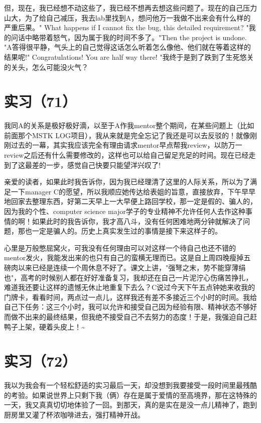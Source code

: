 \documentclass[12pt]{book}
\begin{document}
但，现在，我已经想不动这些了，我已经不想再去想这些问题了。现在的自己压力山大，为了给自己减压，我去lab里找到A，想问他万一我做不出来会有什么样的严重后果。" What happens if I cannot fix the bug, this detailed requirement? "我 的问话中略带着怒气，因为属于我的时间不多了。"Then the project is undone. "A答得很平静，气头上的自己觉得这话怎么听着怎么像他、他们就在等着这样的结果呢!" Congratulations! You are half way there! "我终于是到了跌到了生死悠关的关头，怎么可能没火气？


\section{实习（71）　}
\label{sec-5-74}

我同A的关系是极好极好滴，以至于A作我mentor整个期间，在某些问题上（比如前面那个MSTK LOG项目），我从来就是完全忘记了我还是可以去反驳的！就像刚刚过去的一幕，其实我应该完全有理由请求mentor早点帮我review，以防万一review之后还有什么需要修改的，这样也可以给自己留足充足的时间。现在已经走到了这最差的一步，感觉自己快要只能望洋兴叹了!

亲爱的读者，如果此时我告诉你，因为我已经理清了这里的人际关系，所以为了满足一下manager C的愿望，所以我顺应她传达给表姐的旨意，直接放弃，下午早早地回家去整理东西，好第二天早上一大早便上路回学校，那一定是假的、骗人的，因为我的个性、computer science major学子的专业精神不允许任何人去作这种事情的啊！如果此时的我告诉你，我才高八斗，没有任何困难地两分钟就解决了问题，那也一定是骗人的。历史上真实发生过的事情是接下来这样子的。　

心里是万般憋屈窝火，可我没有任何理由可以对这样一个待自己也还不错的mentor发火，我能发出来的也只有自己的蛮横无理而已。这是自上周四晚瘦掉五磅肉以来已经是连续一个周休息不好了。课文上讲，"强弩之末，势不能穿薄绢也"，高考的时候别人都在好好准备复习，我却还在自己一片泥泞心伤痛苦挣扎，难道我还要让这样的遗憾无休止地重复下去么？C说过今天下午五点钟她来收我的门牌卡，看看时间，两点过一点儿，这样我还有差不多接近三个小时的时间。我给自己下任务：这三个小时，我可以允许和接受自己因为经验有限、精神状态不够好而做不出来的最终结果，但我绝不接受自己不去努力的态度！于是，我强迫自己赶鸭子上架，硬着头皮上！\textasciitilde{}~


\section{实习（72）　}
\label{sec-5-75}

我以为我会有一个轻松舒适的实习最后一天，却没想到我要接受一段时间里最残酷的考验。如果说世界上只剩下我（俩）存在是属于爱情的至高境界，那在这特殊的一天，我又真真切切地体验了一回。到那天，真的是实在是没一点儿精神了，跑到厨房里又灌了杯浓咖啡进去，强打精神开战。
\end{document}

